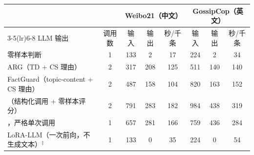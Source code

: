 \begin{tabular}{lccccccc}
\toprule
 & & \multicolumn{3}{c}{Weibo21（中文）} & \multicolumn{3}{c}{GossipCop（英文）} \\
\cmidrule(lr){3-5}\cmidrule(lr){6-8}
LLM 输出 & 调用数 & 输入 & 输出 & 秒/千条 & 输入 & 输出 & 秒/千条 \\
\midrule
零样本判断 & 1 & 133 & 2 & 17 & 224 & 2 & 34 \\
ARG（TD + CS 理由） & 2 & 317 & 208 & 125 & 511 & 140 & 140 \\
FactGuard（topic-content + CS 理由） & 2 & 487 & 158 & 104 & 820 & 163 & 152 \\
\method{}（结构化调用 + 零样本评分） & 2 & 791 & 283 & 182 & 984 & 438 & 319 \\
\method{}，严格单次调用 & 1 & 657 & 281 & 166 & 759 & 436 & 284 \\
\midrule
LoRA-LLM（一次前向，不生成文本）$^\ddagger$ & 1 & 133 & 0 & 35 & 224 & 0 & 54 \\
\bottomrule
\end{tabular}
